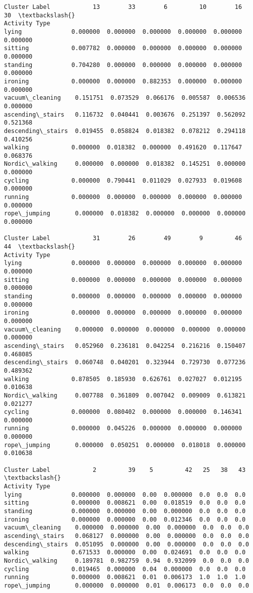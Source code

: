 \documentclass[11pt]{article}
\begin{document}
\begin{tcolorbox}[breakable, size=fbox, boxrule=.5pt, pad at break*=1mm, opacityfill=0]
\begin{Verbatim}[commandchars=\\\{\}]
Cluster Label            13        33        6         10        16        30  \textbackslash{}
Activity Type
lying              0.000000  0.000000  0.000000  0.000000  0.000000  0.000000
sitting            0.007782  0.000000  0.000000  0.000000  0.000000  0.000000
standing           0.704280  0.000000  0.000000  0.000000  0.000000  0.000000
ironing            0.000000  0.000000  0.882353  0.000000  0.000000  0.000000
vacuum\_cleaning    0.151751  0.073529  0.066176  0.005587  0.006536  0.000000
ascending\_stairs   0.116732  0.040441  0.003676  0.251397  0.562092  0.521368
descending\_stairs  0.019455  0.058824  0.018382  0.078212  0.294118  0.410256
walking            0.000000  0.018382  0.000000  0.491620  0.117647  0.068376
Nordic\_walking     0.000000  0.000000  0.018382  0.145251  0.000000  0.000000
cycling            0.000000  0.790441  0.011029  0.027933  0.019608  0.000000
running            0.000000  0.000000  0.000000  0.000000  0.000000  0.000000
rope\_jumping       0.000000  0.018382  0.000000  0.000000  0.000000  0.000000

Cluster Label            31        26        49        9         46        44  \textbackslash{}
Activity Type
lying              0.000000  0.000000  0.000000  0.000000  0.000000  0.000000
sitting            0.000000  0.000000  0.000000  0.000000  0.000000  0.000000
standing           0.000000  0.000000  0.000000  0.000000  0.000000  0.000000
ironing            0.000000  0.000000  0.000000  0.000000  0.000000  0.000000
vacuum\_cleaning    0.000000  0.000000  0.000000  0.000000  0.000000  0.000000
ascending\_stairs   0.052960  0.236181  0.042254  0.216216  0.150407  0.468085
descending\_stairs  0.060748  0.040201  0.323944  0.729730  0.077236  0.489362
walking            0.878505  0.185930  0.626761  0.027027  0.012195  0.010638
Nordic\_walking     0.007788  0.361809  0.007042  0.009009  0.613821  0.021277
cycling            0.000000  0.080402  0.000000  0.000000  0.146341  0.000000
running            0.000000  0.045226  0.000000  0.000000  0.000000  0.000000
rope\_jumping       0.000000  0.050251  0.000000  0.018018  0.000000  0.010638

Cluster Label            2         39    5         42   25   38   43  \textbackslash{}
Activity Type
lying              0.000000  0.000000  0.00  0.000000  0.0  0.0  0.0
sitting            0.000000  0.008621  0.00  0.018519  0.0  0.0  0.0
standing           0.000000  0.000000  0.00  0.000000  0.0  0.0  0.0
ironing            0.000000  0.000000  0.00  0.012346  0.0  0.0  0.0
vacuum\_cleaning    0.000000  0.000000  0.00  0.000000  0.0  0.0  0.0
ascending\_stairs   0.068127  0.000000  0.00  0.000000  0.0  0.0  0.0
descending\_stairs  0.051095  0.000000  0.00  0.000000  0.0  0.0  0.0
walking            0.671533  0.000000  0.00  0.024691  0.0  0.0  0.0
Nordic\_walking     0.189781  0.982759  0.94  0.932099  0.0  0.0  0.0
cycling            0.019465  0.000000  0.04  0.000000  0.0  0.0  0.0
running            0.000000  0.008621  0.01  0.006173  1.0  1.0  1.0
rope\_jumping       0.000000  0.000000  0.01  0.006173  0.0  0.0  0.0


\end{Verbatim}
\end{tcolorbox}
\end{document}
